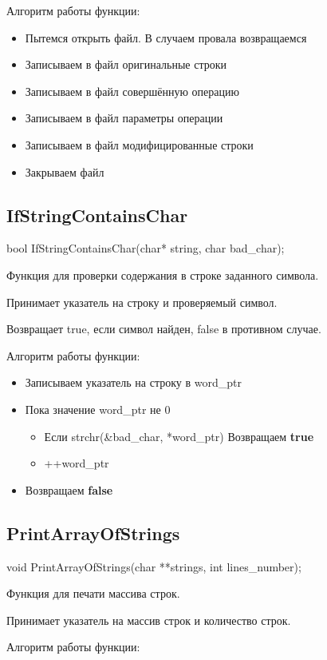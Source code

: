 \documentclass[12pt,a4paper]{article}  %
\begin{document}
	Алгоритм работы функции:
	
	\begin{itemize}
		\item Пытемся открыть файл. В случаем провала возвращаемся
		\item Записываем в файл оригинальные строки
		\item Записываем в файл совершённую операцию
		\item Записываем в файл параметры операции
		\item Записываем в файл модифицированные строки
		\item Закрываем файл
	\end{itemize}
	
	\subsection*{IfStringContainsChar}
	bool IfStringContainsChar(char* string, char bad\_char);
	
	Функция для проверки содержания в строке заданного символа.
	
	Принимает указатель на строку и проверяемый символ.
	
	Возвращает true, если символ найден, false в противном случае.
	
	Алгоритм работы функции:
	
	\begin{itemize}
		\item Записываем указатель на строку в word\_ptr
		\item Пока значение word\_ptr не 0
		\begin{itemize}
			\item Если strchr(\&bad\_char, *word\_ptr) Возвращаем \textbf{true}
			\item ++word\_ptr
		\end{itemize}
		\item Возвращаем \textbf{false}
	\end{itemize}
	
	\subsection*{PrintArrayOfStrings}
	void PrintArrayOfStrings(char **strings, int lines\_number);
	
	Функция для печати массива строк.
	
	Принимает указатель на массив строк и количество строк.
	
	Алгоритм работы функции:
	
\end{document}
